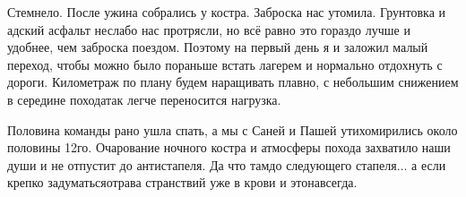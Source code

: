 Стемнело. После ужина собрались у костра. Заброска нас утомила. Грунтовка и адский асфальт неслабо нас протрясли, но всё равно это гораздо лучше и удобнее, чем заброска поездом. Поэтому на первый день я и заложил малый переход, чтобы можно было пораньше встать лагерем и нормально отдохнуть с дороги. Километраж по плану будем наращивать плавно, с небольшим снижением в середине похода\mdash так легче переносится нагрузка.

Половина команды рано ушла спать, а мы с Саней и Пашей утихомирились около половины 12\sdash го. Очарование ночного костра и атмосферы похода захватило наши души и не отпустит до антистапеля. Да что там\mdash до следующего стапеля$\ldots$ а если крепко задуматься\mdash отрава странствий уже в крови и это\mdash навсегда.

\begin{center}
\end{center}
